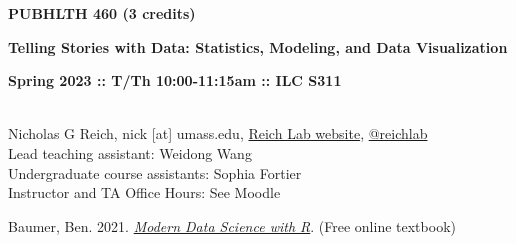 \documentclass[10pt]{article}
\begin{document}
\centerline{\bf \large PUBHLTH 460 (3 credits)}
\centerline{\bf \large Telling Stories with Data: Statistics, Modeling, and Data Visualization}
\centerline{\bf Spring 2023 :: T/Th 10:00-11:15am :: ILC S311 }

\vspace{.25in}
\\
\noindent Nicholas G Reich,  nick [at] umass.edu,  \href{http://reichlab.github.io}{Reich Lab website},  \href{https://twitter.com/reichlab}{@reichlab}\\
\noindent Lead teaching assistant: Weidong Wang\\
\noindent Undergraduate course assistants:
Sophia Fortier\\
\noindent Instructor and TA Office Hours: See Moodle






\bigskip
{}


Baumer, Ben. 2021.  \emph{\href{https://mdsr-book.github.io/mdsr2e/}{Modern Data Science with R}}. (Free online textbook)





\end{document}
